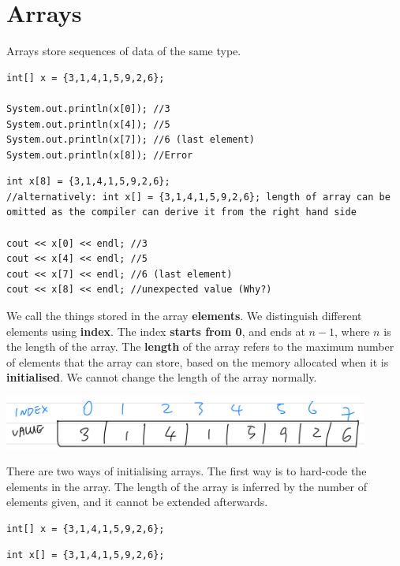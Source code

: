 
\section{Arrays}
\label{sec:arrayintro}
Arrays store sequences of data of the same type.

\if{}
\begin{lstlisting}
int[] x = {3,1,4,1,5,9,2,6};

System.out.println(x[0]); //3 
System.out.println(x[4]); //5
System.out.println(x[7]); //6 (last element)
System.out.println(x[8]); //Error 
\end{lstlisting}
\else
\begin{lstlisting}
int x[8] = {3,1,4,1,5,9,2,6};
//alternatively: int x[] = {3,1,4,1,5,9,2,6}; length of array can be omitted as the compiler can derive it from the right hand side

cout << x[0] << endl; //3 
cout << x[4] << endl; //5
cout << x[7] << endl; //6 (last element)
cout << x[8] << endl; //unexpected value (Why?)
\end{lstlisting}
\fi

We call the things stored in the array \textbf{elements}. We distinguish different elements using \textbf{index}. The index \textbf{starts from 0}, and ends at $n-1$, where $n$ is the length of the array. The \textbf{length} of the array refers to the maximum number of elements that the array can store, based on the memory allocated when it is \textbf{initialised}. We cannot change the length of the array normally.

\includegraphics[width=12cm]{images/ch2-arrayindex.png}
\vspace{6mm}

There are two ways of initialising arrays. The first way is to hard-code the elements in the array. The length of the array is inferred by the number of elements given, and it cannot be extended afterwards.

\if{}
\begin{lstlisting}
int[] x = {3,1,4,1,5,9,2,6};
\end{lstlisting}
\else
\begin{lstlisting}
int x[] = {3,1,4,1,5,9,2,6};
\end{lstlisting}
\fi


